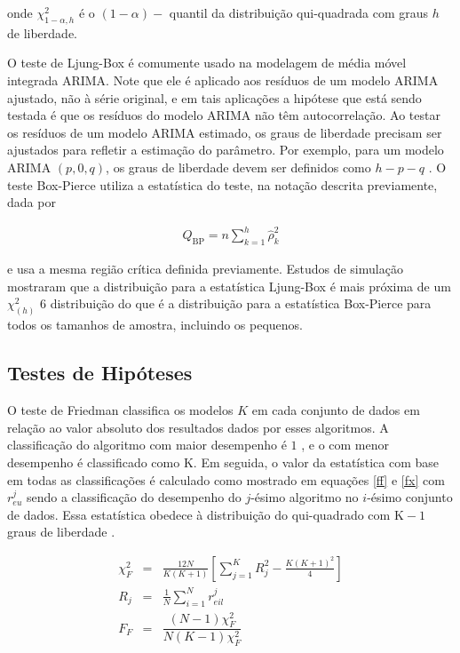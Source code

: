 \noindent onde $\chi_{1-\alpha, h}^2$ é o $(1-\alpha)-$ quantil \cite{Brockwell2002} da distribuição qui-quadrada com graus $h$ de liberdade.
 
O teste de Ljung-Box é comumente usado na modelagem de média móvel integrada ARIMA. Note que ele é aplicado aos resíduos de um modelo ARIMA ajustado, não à série original, e em tais aplicações a hipótese que está sendo testada é que os resíduos do modelo ARIMA não têm autocorrelação. Ao testar os resíduos de um modelo ARIMA estimado, os graus de liberdade precisam ser ajustados para refletir a estimação do parâmetro. Por exemplo, para um modelo ARIMA $(p,0,q)$, os graus de liberdade devem ser definidos como $h-p-q$ \cite{Davidson2000}. O teste Box-Pierce utiliza a estatística do teste, na notação descrita previamente, dada por \cite{box}
 
 \begin{eqnarray}
 	Q_{\mathrm{BP}}=n \sum_{k=1}^h \hat{\rho}_k^2
 \end{eqnarray}
 
\noindent e usa a mesma região crítica definida previamente.
Estudos de simulação mostraram que a distribuição para a estatística Ljung-Box é mais próxima de um $\chi^2_{(h)}$ $6$ distribuição do que é a distribuição para a estatística Box-Pierce para todos os tamanhos de amostra, incluindo os pequenos.
 
 
\subsection{Testes de Hip\'oteses}
 
O teste de Friedman classifica os modelos $K$ em cada conjunto de dados em relação ao valor absoluto dos resultados dados por esses algoritmos. A classificação do algoritmo com maior desempenho é $1$ , e o com menor desempenho é classificado como $\mathrm{K}$. Em seguida, o valor da estatística com base em todas as classificações é calculado como mostrado em equações \eqref{ff} e \eqref{fx} com $r_{e u}^j$ sendo a classificação do desempenho do $j$-ésimo algoritmo no $i$-ésimo conjunto de dados. Essa estatística obedece à distribuição do qui-quadrado com $\mathrm{K}-1$ graus de liberdade \cite{Liu2022}.
 
 \begin{eqnarray}
 	\chi_F^2 & =&\frac{12 N}{K(K+1)}\left[\sum_{j=1}^K R_j^2-\frac{K(K+1)^2}{4}\right] \label{ff}\\
 	R_j & =&\frac{1}{N} \sum_{i=1}^N r_{e i l}^j \label{fx}\\
 	F_F&=&\dfrac{(N-1) \chi_F^2}{N(K-1) \chi_F^2}\label{fx1}
 \end{eqnarray}
 
